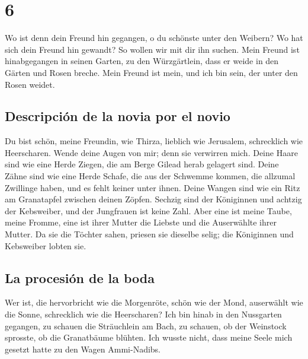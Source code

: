 \hypertarget{section-5}{%
\section{6}\label{section-5}}

 Wo ist denn dein Freund hin gegangen, o du schönste unter
den Weibern? Wo hat sich dein Freund hin gewandt? So wollen wir mit dir
ihn suchen.  Mein Freund ist hinabgegangen in seinen
Garten, zu den Würzgärtlein, dass er weide in den Gärten und Rosen
breche.  Mein Freund ist mein, und ich bin sein, der unter
den Rosen weidet.

\hypertarget{descripciuxf3n-de-la-novia-por-el-novio-1}{%
\subsection{Descripción de la novia por el
novio}\label{descripciuxf3n-de-la-novia-por-el-novio-1}}

 Du bist schön, meine Freundin, wie Thirza, lieblich wie
Jerusalem, schrecklich wie Heerscharen.  Wende deine Augen
von mir; denn sie verwirren mich. Deine Haare sind wie eine Herde
Ziegen, die am Berge Gilead herab gelagert sind.  Deine
Zähne sind wie eine Herde Schafe, die aus der Schwemme kommen, die
allzumal Zwillinge haben, und es fehlt keiner unter ihnen.
 Deine Wangen sind wie ein Ritz am Granatapfel zwischen
deinen Zöpfen.  Sechzig sind der Königinnen und achtzig
der Kebsweiber, und der Jungfrauen ist keine Zahl.  Aber
eine ist meine Taube, meine Fromme, eine ist ihrer Mutter die Liebste
und die Auserwählte ihrer Mutter. Da sie die Töchter sahen, priesen sie
dieselbe selig; die Königinnen und Kebsweiber lobten sie.

\hypertarget{la-procesiuxf3n-de-la-boda}{%
\subsection{La procesión de la boda}\label{la-procesiuxf3n-de-la-boda}}

 Wer ist, die hervorbricht wie die Morgenröte, schön wie
der Mond, auserwählt wie die Sonne, schrecklich wie die Heerscharen?
 Ich bin hinab in den Nussgarten gegangen, zu schauen die
Sträuchlein am Bach, zu schauen, ob der Weinstock sprosste, ob die
Granatbäume blühten.  Ich wusste nicht, dass meine Seele
mich gesetzt hatte zu den Wagen Ammi-Nadibs.


